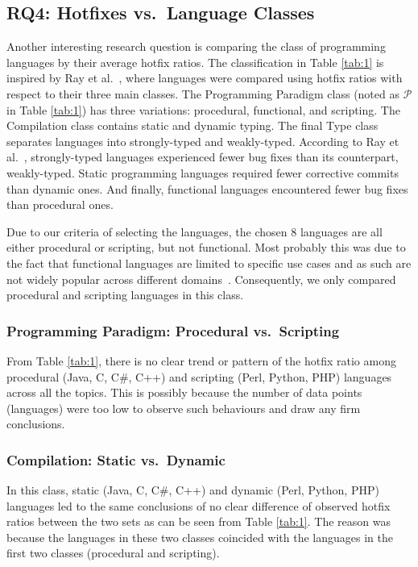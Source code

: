 \documentclass{sig-alternate}
\begin{document}
\subsection{RQ4: Hotfixes vs.\ Language Classes}
Another interesting research question is comparing the class of programming languages by their average hotfix ratios. The classification in Table \ref{tab:1} is inspired by Ray et al.~\cite{Ray2014}, where languages were compared using hotfix ratios with respect to their three main classes. The Programming Paradigm class (noted as $\mathcal{P}$ in Table \ref{tab:1}) has three variations: procedural, functional, and scripting. The Compilation class contains static and dynamic typing. The final Type class separates languages into strongly-typed and weakly-typed. According to Ray et al.~\cite{Ray2014}, strongly-typed languages experienced fewer bug fixes than its counterpart, weakly-typed. Static programming languages required fewer corrective commits than dynamic ones. And finally, functional languages encountered fewer bug fixes than procedural ones.

Due to our criteria of selecting the languages, the chosen 8 languages are all either procedural or scripting, but not functional. Most probably this was due to the fact that functional languages are limited to specific use cases and as such are not widely popular across different domains~\cite{Wadler1999}. Consequently, we only compared procedural and scripting languages in this class.

\subsubsection*{Programming Paradigm: Procedural vs.\ Scripting}
From Table \ref{tab:1}, there is no clear trend or pattern of the hotfix ratio among procedural (Java, C, C\#, C++) and scripting (Perl, Python, PHP) languages across all the topics. This is possibly because the number of data points (languages) were too low to observe such behaviours and draw any firm conclusions. %

\subsubsection*{Compilation: Static vs.\ Dynamic}
In this class, static (Java, C, C\#, C++) and dynamic (Perl, Python, PHP) languages led to the same conclusions of no clear difference of observed hotfix ratios between the two sets as can be seen from Table \ref{tab:1}. The reason was because the languages in these two classes coincided with the languages in the first two classes (procedural and scripting).
\end{document}

